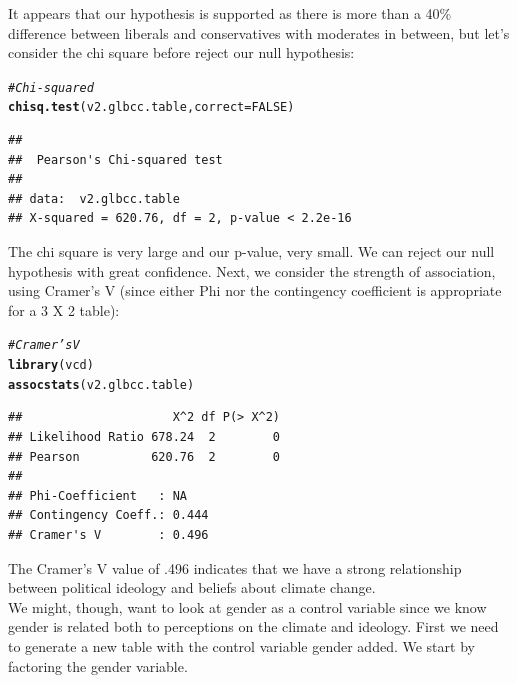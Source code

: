 \documentclass[11pt,openany]{book}\usepackage[]{graphicx}\usepackage[]{color}
\makeatletter
\newcommand{\hlnum}[1]{\textcolor[rgb]{0.686,0.059,0.569}{#1}}%
\newcommand{\hlcom}[1]{\textcolor[rgb]{0.678,0.584,0.686}{\textit{#1}}}%
\newcommand{\hlstd}[1]{\textcolor[rgb]{0.345,0.345,0.345}{#1}}%
\newcommand{\hlkwc}[1]{\textcolor[rgb]{0.333,0.667,0.333}{#1}}%
\newcommand{\hlkwd}[1]{\textcolor[rgb]{0.737,0.353,0.396}{\textbf{#1}}}%
\newenvironment{kframe}{%
 \def\at@end@of@kframe{}%
 \ifinner\ifhmode%
  \def\at@end@of@kframe{\end{minipage}}%
  \begin{minipage}{\columnwidth}%
 \fi\fi%
 \def\FrameCommand##1{\hskip\@totalleftmargin \hskip-\fboxsep
 \colorbox{shadecolor}{##1}\hskip-\fboxsep
     \hskip-\linewidth \hskip-\@totalleftmargin \hskip\columnwidth}%
 \MakeFramed {\advance\hsize-\width
   \@totalleftmargin\z@ \linewidth\hsize
   \@setminipage}}%
 {\par\unskip\endMakeFramed%
 \at@end@of@kframe}
\newenvironment{knitrout}{}{} %
\renewenvironment{knitrout}{\begin{singlespace}}{\end{singlespace}}
\makeatother
\begin{document}
\noindent It appears that our hypothesis is supported as there is more than a 40\% difference between liberals and conservatives with moderates in between, but let's consider the chi square before reject our null hypothesis:
\begin{knitrout}
\color{fgcolor}\begin{kframe}
\begin{alltt}
\hlcom{# Chi-squared}
\hlkwd{chisq.test}\hlstd{(v2.glbcc.table,} \hlkwc{correct} \hlstd{=} \hlnum{FALSE}\hlstd{)}
\end{alltt}
\begin{verbatim}
## 
## 	Pearson's Chi-squared test
## 
## data:  v2.glbcc.table
## X-squared = 620.76, df = 2, p-value < 2.2e-16
\end{verbatim}
\end{kframe}
\end{knitrout}

\noindent The chi square is very large and our p-value, very small. We can reject our null hypothesis with great confidence.  Next, we consider the strength of association, using Cramer's V (since either Phi nor the contingency coefficient is appropriate for a 3 X 2 table):

\begin{knitrout}
\color{fgcolor}\begin{kframe}
\begin{alltt}
\hlcom{# Cramer's V}
\hlkwd{library}\hlstd{(vcd)}
\hlkwd{assocstats}\hlstd{(v2.glbcc.table)}
\end{alltt}
\begin{verbatim}
##                     X^2 df P(> X^2)
## Likelihood Ratio 678.24  2        0
## Pearson          620.76  2        0
## 
## Phi-Coefficient   : NA 
## Contingency Coeff.: 0.444 
## Cramer's V        : 0.496
\end{verbatim}
\end{kframe}
\end{knitrout}

\noindent The Cramer's V value of .496 indicates that we have a strong relationship between political ideology and beliefs about climate change.\\

We might, though, want to look at gender as a control variable since we know gender is related both to perceptions on the climate and ideology.  First we need to generate a new table with the control variable gender added.  We start by factoring the gender variable.
\end{document}
